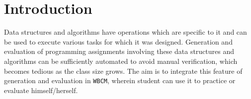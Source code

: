 \documentclass[aps,letterpaper,12pt]{revtex4}
\newcommand{\labtitle}{Online facilities for supporting and
evaluating teaching-learning activities.}
\newcommand{\authorname}{Yerra Pranay Hasan}
\newcommand{\classno}{11CS30042}
\newcommand{\professor}{Prof. Chittaranjan Mandal}
\begin{document}


\begin{titlepage}
\begin{center}
{\LARGE \textsc{Design Laboratory} \\ \vspace{4pt}}
{\Large \textsc{\labtitle} \\ \vspace{4pt}} 
\rule[13pt]{\textwidth}{1pt} \\ \vspace{150pt}
{\large Min-Heap Data Structure\\ \vspace{10pt}
{\large By\\ \vspace{10pt}
{\large \authorname \\ \vspace{10pt}
[\classno ] \\ \vspace{10pt}
Guide: \professor \\ \vspace{10pt}
\today}
\end{center}
\end{titlepage}





\section{Introduction}

Data structures and algorithms have operations which are specific to it and can be used to execute various tasks for which it was designed. Generation and evaluation of programming assignments involving these data structures and algorithms can be sufficiently automated to avoid manual verification, which becomes tedious as the class size grows. The aim is to integrate this feature of generation and evaluation in \texttt{WBCM}, wherein student can use it to practice or evaluate himself/herself. \vspace{3mm} 
\end{document}
